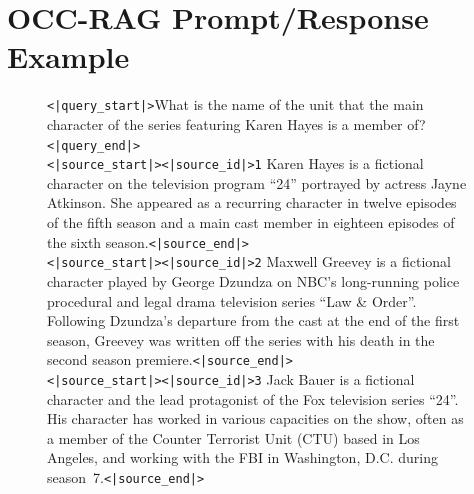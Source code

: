 \documentclass{llmxive}
\providecommand{\ptok}[1]{{\texttt{<|#1|>}}}
\providecommand{\srcid}[1]{{\texttt{<|source\_id|>#1}}}
\begin{document}
\section{OCC-RAG Prompt/Response Example}
\label{sec:prompt-trace}
\begin{figure}[htbp]
\begin{tcolorbox}[
    colback=gray!5!white,
    colframe=gray!75!black,
    title=Prompt,
    fonttitle=\bfseries,
    breakable,
    enhanced,
    fontupper=\ttfamily\footnotesize,
]
\ptok{query\_start}What is the name of the unit that the main character of the series featuring Karen Hayes is a member of?\ptok{query\_end}\\
\ptok{source\_start}\srcid{1} Karen Hayes is a fictional character on the television program ``24'' portrayed by actress Jayne Atkinson. She appeared as a recurring character in twelve episodes of the fifth season and a main cast member in eighteen episodes of the sixth season.\ptok{source\_end}\\
\ptok{source\_start}\srcid{2} Maxwell Greevey is a fictional character played by George Dzundza on NBC's long-running police procedural and legal drama television series ``Law \& Order''. Following Dzundza's departure from the cast at the end of the first season, Greevey was written off the series with his death in the second season premiere.\ptok{source\_end}\\
\ptok{source\_start}\srcid{3} Jack Bauer is a fictional character and the lead protagonist of the Fox television series ``24''. His character has worked in various capacities on the show, often as a member of the Counter Terrorist Unit (CTU) based in Los Angeles, and working with the FBI in Washington, D.C. during season~7.\ptok{source\_end}
\end{tcolorbox}


\end{figure}
\end{document}
